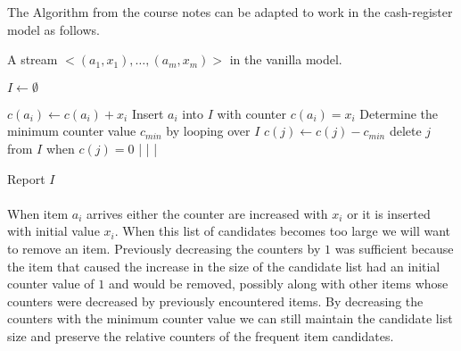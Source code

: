 The Algorithm from the course notes can be adapted to work in the cash-register model as follows.

\begin{minipage}[t]{\textwidth}
\begin{sourcecode}
A stream $<(a_1, x_1), \ldots , (a_m, x_m)>$ in the vanilla model.
\silend

$I \leftarrow \emptyset$
\silend

	$c(a_i) \leftarrow c(a_i) + x_i$
\qelse
	Insert $a_i$ into $I$ with counter $c(a_i) = x_i$
		Determine the minimum counter value $c_{\textit{min}}$ by looping over $I$
			$c(j) \leftarrow c(j) - c_{\textit{min}}$
			delete $j$ from $I$ when $c(j) = 0$ 
		|
	|			
|
\silend

Report $I$
\qend
\end{sourcecode}
\end{minipage}

\paragraph{} When item $a_i$ arrives either the counter are increased with $x_i$ or it is inserted with initial value $x_i$. When this list of candidates becomes too large we will want to remove an item. Previously decreasing the counters by $1$ was sufficient because the item that caused the increase in the size of the candidate list had an initial counter value of $1$ and would be removed, possibly along with other items whose counters were decreased by previously encountered items. By decreasing the counters with the minimum counter value we can still maintain the candidate list size and preserve the relative counters of the frequent item candidates.
